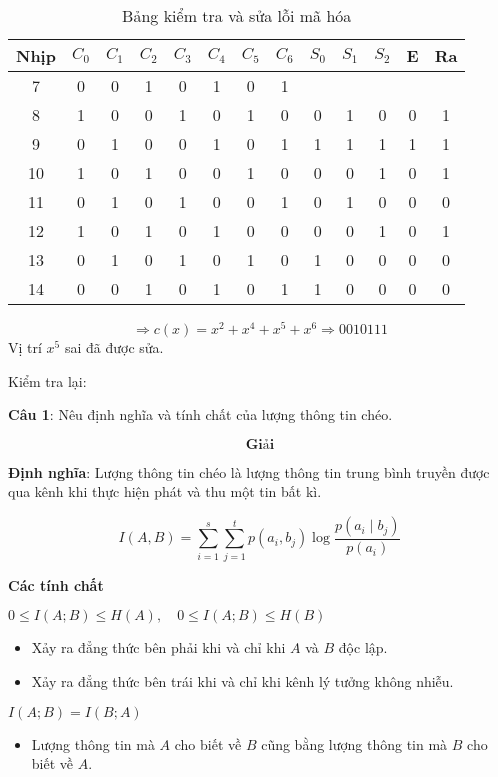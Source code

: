 \documentclass[12pt]{article}
\begin{document}
\begin{table}[h]
\centering
\begin{tabular}{|c|c c c c c c c|c c c|c|c|}
\hline
\textbf{Nhịp} & $C_0$ & $C_1$ & $C_2$ & $C_3$ & $C_4$ & $C_5$ & $C_6$ & $S_0$ & $S_1$ & $S_2$ & E & Ra \\ 
\hline
7  & 0 & 0 & 1 & 0 & 1 & 0 & 1 &   &   &   &   &   \\
8  & 1 & 0 & 0 & 1 & 0 & 1 & 0 & 0 & 1 & 0 & 0 & 1  \\
9  & 0 & 1 & 0 & 0 & 1 & 0 & 1 & 1 & 1 & 1 & 1 & 1  \\
10 & 1 & 0 & 1 & 0 & 0 & 1 & 0 & 0 & 0 & 1 & 0 & 1  \\
11 & 0 & 1 & 0 & 1 & 0 & 0 & 1 & 0 & 1 & 0 & 0 & 0  \\
12 & 1 & 0 & 1 & 0 & 1 & 0 & 0 & 0 & 0 & 1 & 0 & 1  \\
13 & 0 & 1 & 0 & 1 & 0 & 1 & 0 & 1 & 0 & 0 & 0 & 0  \\
14 & 0 & 0 & 1 & 0 & 1 & 0 & 1 & 1 & 0 & 0 & 0 & 0  \\
\hline
\end{tabular}
\caption{Bảng kiểm tra và sửa lỗi mã hóa}
\end{table}
\[
\Rightarrow c(x) = x^2 + x^4 + x^5 + x^6 \Rightarrow 0010111
\]
Vị trí $x^5$ sai đã được sửa.

Kiểm tra lại:

\newpage
\textbf{Câu 1}: Nêu định nghĩa và tính chất của lượng thông tin chéo.

\[\textbf{Giải}\]

   \textbf{Định nghĩa}: Lượng thông tin chéo là lượng thông tin trung bình truyền được qua kênh khi thực hiện phát và thu một tin bất kì.  

\[
I(A, B) = \sum_{i=1}^{s} \sum_{j=1}^{t} p(a_i, b_j) \log \frac{p(a_i \mid b_j)}{p(a_i)}
\]

\textbf{Các tính chất}

$
0 \leq I(A; B) \leq H(A), \quad 0 \leq I(A; B) \leq H(B)
$

\begin{itemize}
    \item Xảy ra đẳng thức bên phải khi và chỉ khi \( A \) và \( B \) độc lập.
    \item Xảy ra đẳng thức bên trái khi và chỉ khi kênh lý tưởng không nhiễu.
\end{itemize}

$
I(A; B) = I(B; A)
$

\begin{itemize}
    \item Lượng thông tin mà \( A \) cho biết về \( B \) cũng bằng lượng thông tin mà \( B \) cho biết về \( A \).
\end{itemize}
\end{document}
